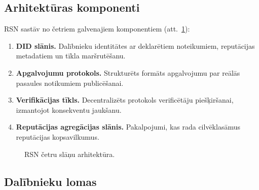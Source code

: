 \documentclass[11pt,a4paper,twocolumn]{article}
\begin{document}
\subsection{Arhitektūras komponenti}

RSN sastāv no četriem galvenajiem komponentiem (att.~\ref{fig:architecture}):
\begin{enumerate}[nosep]
\item \textbf{DID slānis.} Dalībnieku identitātes ar deklarētiem noteikumiem, reputācijas metadatiem un tīkla maršrutēšanu.
\item \textbf{Apgalvojumu protokols.} Strukturēts formāts apgalvojumu par reālās pasaules notikumiem publicēšanai.
\item \textbf{Verifikācijas tīkls.} Decentralizēts protokols verificētāju piešķiršanai, izmantojot konsekventu jaukšanu.
\item \textbf{Reputācijas agregācijas slānis.} Pakalpojumi, kas rada cilvēklasāmus reputācijas kopsavilkumus.
\end{enumerate}

\begin{figure}[ht]
\centering
{}
\caption{RSN četru slāņu arhitektūra.}
\label{fig:architecture}
\end{figure}

\subsection{Dalībnieku lomas}
\end{document}

